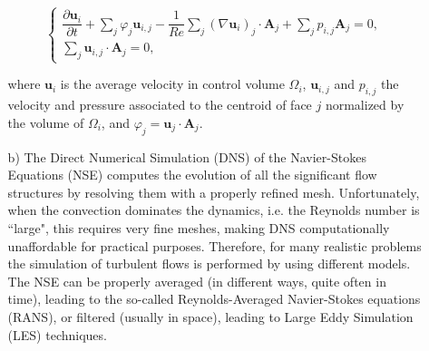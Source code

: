 \documentclass{article}
\begin{document}
\begin{enumerate}
\begin{itemize}
\begin{equation*}
\begin{cases}
\dfrac{\partial \mathbf{u}_i}{\partial t} +  \sum_j^{} \varphi_j \mathbf{u}_{i,j} - \dfrac{1}{Re} \sum_j^{} (\nabla\mathbf{u}_i)_j \cdot \textbf{A}_j + \sum_j^{} p_{i,j} \textbf{A}_j  = 0, \\
\sum_j^{} \mathbf{u}_{i,j} \cdot \textbf{A}_j = 0,
\end{cases}
\end{equation*}

where $\mathbf{u}_i$ is the average velocity in control volume $\Omega_i$, $\mathbf{u}_{i,j}$ and $p_{i,j}$ the velocity and pressure
associated to the centroid of face $j$ normalized by the volume of $\Omega_i$, and $\varphi_j = \mathbf{u}_j \cdot \textbf{A}_j$.

\item[b)] The Direct Numerical Simulation (DNS) of the Navier-Stokes Equations (NSE) computes the evolution of all the significant flow structures by resolving them with a properly refined mesh. Unfortunately, when the convection dominates the dynamics, i.e. the Reynolds number is ``large", this requires very fine meshes, making DNS computationally unaffordable for practical purposes. Therefore, for many realistic problems the simulation of turbulent flows is performed by using different models. The NSE can be properly averaged (in different ways, quite often in time), leading to the so-called Reynolds-Averaged Navier-Stokes equations (RANS), or filtered (usually in space), leading to Large Eddy Simulation (LES) techniques.
\end{itemize}
\end{enumerate}
\end{document}
